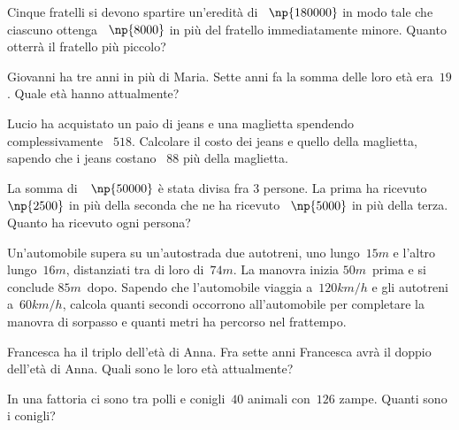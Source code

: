 \begin{multicols}{2}
\begin{esercizio}[\Ast]
\label{ese:16.66}
Cinque fratelli si devono spartire un'eredità di \officialeuro~$\np{180000}$ in modo tale che ciascuno ottenga \officialeuro~$\np{8000}$ in più del fratello immediatamente minore. Quanto otterrà il fratello più piccolo?
\end{esercizio}

\begin{esercizio}[\Ast]
\label{ese:16.67}
Giovanni ha tre anni in più di Maria. Sette anni fa la somma delle loro età era~$19$. Quale età hanno attualmente?
\end{esercizio}

\begin{esercizio}[\Ast]
\label{ese:16.68}
Lucio ha acquistato un paio di jeans e una maglietta spendendo complessivamente \officialeuro~$518$. Calcolare il costo dei jeans e quello della maglietta, sapendo che i jeans costano \officialeuro~$88$ più della maglietta.
\end{esercizio}

\begin{esercizio}[\Ast]
\label{ese:16.69}
La somma di~\officialeuro~$\np{50000}$ è stata divisa fra 3 persone. La prima ha ricevuto \officialeuro~$\np{2500}$ in più della seconda che ne ha ricevuto \officialeuro~$\np{5000}$ in più della terza. Quanto ha ricevuto ogni persona?
\end{esercizio}

\begin{esercizio}[\Ast]
\label{ese:16.70}
Un'automobile supera su un'autostrada due autotreni, uno lungo~$15\unit{m}$ e l'altro lungo~$16\unit{m}$, distanziati tra di loro di~$74\unit{m}$. La manovra inizia $50\unit{m}$~prima e si conclude $85\unit{m}$~dopo. Sapendo che l'automobile viaggia a~$120\unit{km/h}$ e gli autotreni a~$60\unit{km/h}$, calcola quanti secondi occorrono all'automobile per completare la manovra di sorpasso e quanti metri ha percorso nel frattempo.
\end{esercizio}

\begin{esercizio}[\Ast]
\label{ese:16.71}
Francesca ha il triplo dell'età di Anna. Fra sette anni Francesca avrà il doppio dell'età di Anna. Quali sono le loro età attualmente?
\end{esercizio}

\begin{esercizio}[\Ast]
\label{ese:16.72}
In una fattoria ci sono tra polli e conigli~$40$ animali con~$126$ zampe. Quanti sono i conigli?
\end{esercizio}


\end{multicols}
